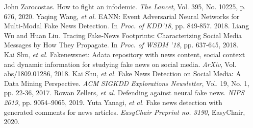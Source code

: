 {	%
	{\footnotesize 
	\begin{thebibliography}{99}
		\vspace*{-2mm}
		\setlength{\parskip}{0cm}
		\setlength{\itemsep}{0cm}
		\begin{spacing}{0.7}
		 John Zarocostas. How to fight an infodemic. \textit{The Lancet}, Vol. 395, No. 10225, p. 676, 2020.
		 Yaqing Wang, \textit{et al.} EANN: Event Adversarial Neural Networks for Multi-Modal Fake News Detection. In \textit{Proc. of KDD'18}, pp. 849-857. 2018.
		 Liang Wu and Huan Liu. Tracing Fake-News Footprints: Characterizing Social Media Messages by How They Propagate. In \textit{Proc. of WSDM '18},  pp. 637-645, 2018.
		 Kai Shu, \textit{et al.} Fakenewsnet: Adata repository with news content, social context and dynamic information for studying fake news on social media. \textit{ArXiv}, Vol. abs/1809.01286, 2018.
		 Kai Shu, \textit{et al.} Fake News Detection on Social Media: A Data Mining Perspective. \textit{ACM SIGKDD Explorations Newsletter}, Vol. 19, No. 1, pp. 22-36, 2017.
		 Rowan Zellers, \textit{et al.} Defending against neural fake news. \textit{NIPS 2019}, pp. 9054–9065, 2019.
		 Yuta Yanagi, \textit{et al.} Fake news detection with generated comments for news articles. \textit{EasyChair Preprint no. 3190}, EasyChair, 2020.
		\end{spacing}
	\end{thebibliography}
	}
}

